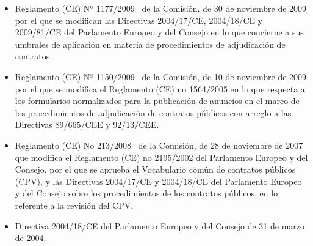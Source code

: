 \begin{itemize}
\item Reglamento (CE) Nº 1177/2009~\cite{r1177} de la Comisión, de 30 de noviembre de 2009 por el que se modifican las Directivas 2004/17/CE, 2004/18/CE y 2009/81/CE del Parlamento Europeo y del Consejo en lo que concierne a sus umbrales de aplicación en materia de procedimientos de adjudicación de contratos.

\item Reglamento (CE) Nº 1150/2009~\cite{r1150} de la Comisión, de 10 de noviembre de 2009 por el que se modifica el Reglamento (CE) no 1564/2005 en lo que respecta a los formularios normalizados para la publicación de anuncios en el marco de los procedimientos de adjudicación
de contratos públicos con arreglo a las Directivas 89/665/CEE y 92/13/CEE.

\item Reglamento (CE) No 213/2008~\cite{r213} de la Comisión, de 28 de noviembre de 2007 que modifica el Reglamento (CE) no 2195/2002 del Parlamento Europeo y del Consejo, por el que se aprueba el Vocabulario común de contratos públicos (CPV), y las Directivas 2004/17/CE y 2004/18/CE del Parlamento Europeo y del Consejo sobre los procedimientos de los contratos públicos, en lo referente a la revisión del CPV.

\item Directiva 2004/18/CE del Parlamento Europeo y del Consejo de 31 de marzo de 2004.


\end{itemize}
